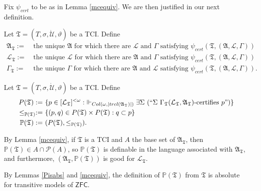\documentclass[12pt]{article}
\numberwithin{equation}{section}
\begin{document}
Fix $\psi_{cert}$ to be as in Lemma \ref{mcequiv}. We are then justified in our next definition.

\begin{defi}
Let $\mathfrak{T} = (T, \sigma, \dot{\mathcal{U}}, \vartheta)$ be a TCI. Define
\begin{align*}
    \mathfrak{A}_{\mathfrak{T}} := \ & \text{the unique } \mathfrak{A} \text{ for which there are } \mathcal{L} \text{ and } \Gamma \text{ satisfying } \psi_{cert}(\mathfrak{T}, (\mathfrak{A}, \mathcal{L}, \Gamma)) \\
    \mathcal{L}_{\mathfrak{T}} := \ & \text{the unique } \mathcal{L} \text{ for which there are } \mathfrak{A} \text{ and } \Gamma \text{ satisfying } \psi_{cert}(\mathfrak{T}, (\mathfrak{A}, \mathcal{L}, \Gamma)) \\
    \Gamma_{\mathfrak{T}} := \ & \text{the unique } \Gamma \text{ for which there are } \mathfrak{A} \text{ and } \mathcal{L} \text{ satisfying } \psi_{cert}(\mathfrak{T}, (\mathfrak{A}, \mathcal{L}, \Gamma)) \text{.}
\end{align*}
\end{defi}

\begin{defi}
Let $\mathfrak{T} = (T, \sigma, \dot{\mathcal{U}}, \vartheta)$ be a TCI. Define \begin{align*}
    P(\mathfrak{T}) := \ & \{p \in [\mathcal{L}_{\mathfrak{T}}]^{< \omega} : \ \Vdash_{Col(\omega, |trcl(\mathfrak{A}_{\mathfrak{T}})|)} \exists \Sigma \ (``\Sigma \ \Gamma_{\mathfrak{T}} (\mathcal{L}_{\mathfrak{T}}, \mathfrak{A}_{\mathfrak{T}})\text{-certifies } p")\} \\
    \leq_{\mathbb{P}(\mathfrak{T})} := \ & \{(p, q) \in P(\mathfrak{T}) \times P(\mathfrak{T}) : q \subset p\} \\
    \mathbb{P}(\mathfrak{T}) := \ & (P(\mathfrak{T}), \leq_{\mathbb{P}(\mathfrak{T})}) \text{.}
\end{align*}
\end{defi}

By Lemma \ref{mcequiv}, if $\mathfrak{T}$ is a TCI and $A$ the base set of $\mathfrak{A}_{\mathfrak{T}}$, then $\mathbb{P}(\mathfrak{T}) \in A \cap \mathcal{P}(A)$, so $\mathbb{P}(\mathfrak{T})$ is definable in the language associated with $\mathfrak{A}_{\mathfrak{T}}$, and furthermore, $(\mathfrak{A}_{\mathfrak{T}}, \mathbb{P}(\mathfrak{T}))$ is good for $\mathcal{L}_{\mathfrak{T}}$.

By Lemmas \ref{Pisabs} and \ref{mcequiv}, the definition of $\mathbb{P}(\mathfrak{T})$ from $\mathfrak{T}$ is absolute for transitive models of $\mathsf{ZFC}$.
\end{document}
